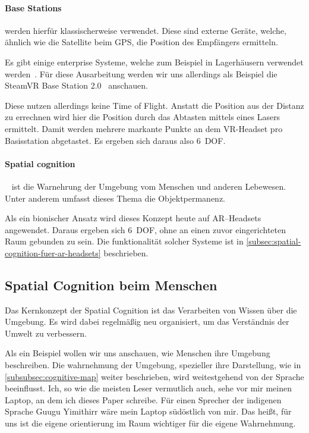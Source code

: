         \paragraph{Base Stations}\label{par:base-stations} werden hierfür klassischerweise verwendet.
            Diese sind externe Geräte, welche, ähnlich wie die Satellite beim GPS, die Position des Empfängers ermitteln.

            Es gibt einige enterprise Systeme, welche zum Beispiel in Lagerhäusern verwendet werden~\autocite{wikipedia-contributors-2023E}.
            Für diese Ausarbeitung werden wir uns allerdings als Beispiel die SteamVR Base Station 2.0~\autocite{valve-corporation-no-date} anschauen.

            Diese nutzen allerdings keine Time of Flight.
            Anstatt die Position aus der Distanz zu errechnen wird hier die Position durch das Abtasten mittels eines Lasers ermittelt.
            Damit werden mehrere markante Punkte an dem VR-Headset pro Basisstation abgetastet.
            Es ergeben sich daraus also 6~DOF\@.

        \paragraph{Spatial cognition}~\autocite{wikipedia-contributors-2023F} ist die Warnehrung der Umgebung vom Menschen und anderen Lebewesen.
            Unter anderem umfasst dieses Thema die Objektpermanenz.

            Als ein bionischer Ansatz wird dieses Konzept heute auf AR--Headsets angewendet.
            Daraus ergeben sich 6~DOF, ohne an einen zuvor eingerichteten Raum gebunden zu sein.
            Die funktionalität solcher Systeme ist in \autoref{subsec:spatial-cognition-fuer-ar-headsets} beschrieben.

\subsection{Spatial Cognition beim Menschen}\label{subsec:spatial-cognition-beim-menschen}
    Das Kernkonzept der Spatial Cognition ist das Verarbeiten von Wissen über die Umgebung. \autocite{wikipedia-contributors-2023F}
    Es wird dabei regelmäßig neu organisiert, um das Verständnis der Umwelt zu verbessern.

    Als ein Beispiel wollen wir uns anschauen, wie Menschen ihre Umgebung beschreiben.
    Die wahrnehmung der Umgebung, spezieller ihre Darstellung, wie in \autoref{subsubsec:cognitive-map} weiter beschrieben, wird weitestgehend von der Sprache beeinflusst. \autocite{haviland-1998}
    Ich, so wie die meisten Leser vermutlich auch, sehe vor mir meinen Laptop, an dem ich dieses Paper schreibe.
    Für einen Sprecher der indigenen Sprache Guugu Yimithirr wäre mein Laptop südöstlich von mir.
    Das heißt, für uns ist die eigene orientierung im Raum wichtiger für die eigene Wahrnehmung.

